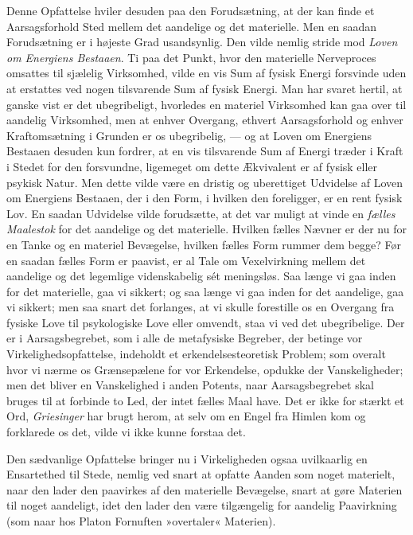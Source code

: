 \documentclass[12pt,a4paper,openany]{book}
\newcommand{\opage}[1]{\marginnote{\footnotesize\textit{[#1]}}}
\begin{document}
Denne Opfattelse hviler desuden paa den Forudsætning, at der kan finde
et Aarsagsforhold Sted mellem det aandelige og det materielle. Men en
saadan Forudsætning er i højeste Grad usandsynlig. Den vilde nemlig
stride mod \emph{Loven om Energiens Bestaaen}. Ti paa det Punkt, hvor
den materielle Nerveproces omsattes til sjælelig Virksomhed, vilde en
vis Sum af fysisk Energi forsvinde uden at erstattes ved nogen
tilsvarende Sum af fysisk Energi. Man har svaret hertil, at ganske vist
er det ubegribeligt, hvorledes en materiel Virksomhed kan gaa over til
aandelig Virksomhed, men at enhver Overgang, ethvert Aarsagsforhold og
enhver Kraftomsætning i Grunden er os ubegribelig, --- og at Loven om
Energiens Bestaaen desuden kun fordrer, at en vis tilsvarende Sum af
Energi træder i Kraft i Stedet for den forsvundne, ligemeget om dette
Ækvivalent er af fysisk eller psykisk Natur. Men dette vilde være en
dristig og uberettiget Udvidelse af Loven om Energiens Bestaaen, der i
den Form, i hvilken den foreligger, er en rent fysisk Lov. En saadan
Udvidelse vilde forudsætte, at det var muligt at vinde en \emph{fælles
Maalestok} for det aandelige og det materielle. Hvilken fælles Nævner er
der nu for en Tanke og en materiel Bevægelse, hvilken fælles Form rummer
dem begge? Før en saadan fælles Form er paavist, er al Tale om
Vexelvirkning mellem det aandelige og det legemlige videnskabelig sét
meningsløs. Saa længe vi gaa inden for det materielle, gaa vi sikkert;
og saa længe vi gaa inden for det aandelige, gaa vi
\opage{68}sikkert; men saa snart det forlanges, at vi skulle forestille
os en Overgang fra fysiske Love til psykologiske Love eller omvendt,
staa vi ved det ubegribelige. Der er i Aarsagsbegrebet, som i alle de
metafysiske Begreber, der betinge vor Virkelighedsopfattelse, indeholdt
et erkendelsesteoretisk Problem; som overalt hvor vi nærme os
Grænsepælene for vor Erkendelse, opdukke der Vanskeligheder; men det
bliver en Vanskelighed i anden Potents, naar Aarsagsbegrebet skal bruges
til at forbinde to Led, der intet fælles Maal have. Det er ikke for
stærkt et Ord, \emph{Griesinger} har brugt herom, at selv om en Engel
fra Himlen kom og forklarede os det, vilde vi ikke kunne forstaa det.

Den sædvanlige Opfattelse bringer nu i Virkeligheden ogsaa uvilkaarlig
en Ensartethed til Stede, nemlig ved snart at opfatte Aanden som noget
materielt, naar den lader den paavirkes af den materielle Bevægelse,
snart at gøre Materien til noget aandeligt, idet den lader den være
tilgængelig for aandelig Paavirkning (som naar hos Platon Fornuften
»overtaler« Materien).
\end{document}
